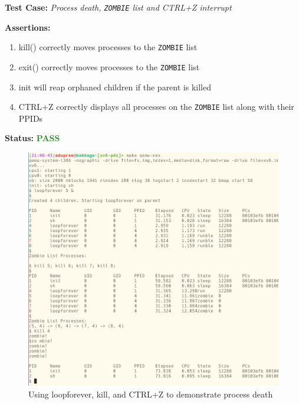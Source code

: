 \documentclass[11pt,letterpaper]{report}
\newcommand{\code}[1]{\colorbox{codegray}{\texttt{#1}}}
\begin{document}
{  \pagebreak

  \noindent\textbf{Test Case:} \emph{Process death, \code{ZOMBIE} list and CTRL+Z interrupt}
  
  \noindent\textbf{Assertions:}
  \begin{enumerate}[]
  \item kill() correctly moves processes to the \code{ZOMBIE} list
  \item exit() correctly moves processes to the \code{ZOMBIE} list
  \item init will reap orphaned children if the parent is killed
  \item CTRL+Z correctly displays all processes on the \code{ZOMBIE} list along with their PPIDs
  \end{enumerate}  
  
  \noindent\textbf{Status:} \textcolor{ForestGreen}{\textbf{PASS}}
  
  \begin{figure}[h!]
	\centering
  \includegraphics[width=1\linewidth]{processdeath1.png}
	\caption[img]{Using loopforever, kill, and CTRL+Z to demonstrate process death}
	\label{fig:P1compileP0-1}
  \end{figure}

}
\end{document}
